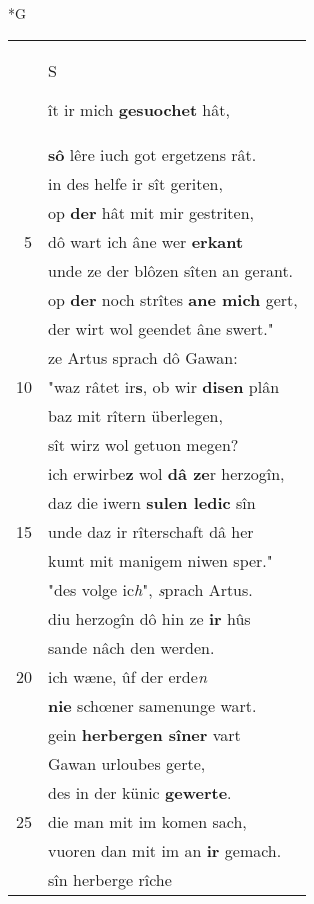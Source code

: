 \documentclass[8pt,a4paper,notitlepage]{article}
\begin{document}
\begin{table}[ht]
\begin{minipage}[t]{0.5\linewidth}
\small
\begin{center}*G
\end{center}
\begin{tabular}{rl}
 & \begin{large}S\end{large}ît ir mich \textbf{gesuochet} hât,\\ 
 & \textbf{sô} lêre iuch got ergetzens rât.\\ 
 & in des helfe ir sît geriten,\\ 
 & op \textbf{der} hât mit mir gestriten,\\ 
5 & dô wart ich âne wer \textbf{erkant}\\ 
 & unde ze der blôzen sîten an gerant.\\ 
 & op \textbf{der} noch strîtes \textbf{ane mich} gert,\\ 
 & der wirt wol geendet âne swert."\\ 
 & ze Artus sprach dô Gawan:\\ 
10 & "waz râtet ir\textbf{s}, ob wir \textbf{disen} plân\\ 
 & baz mit rîtern überlegen,\\ 
 & sît wirz wol getuon megen?\\ 
 & ich erwirbe\textbf{z} wol \textbf{dâ ze}r herzogîn,\\ 
 & daz die iwern \textbf{sulen ledic} sîn\\ 
15 & unde daz ir rîterschaft dâ her\\ 
 & kumt mit manigem niwen sper."\\ 
 & "des volge ic\textit{h}", \textit{s}prach Artus.\\ 
 & diu herzogîn dô hin ze \textbf{ir} hûs\\ 
 & sande nâch den werden.\\ 
20 & ich wæne, ûf der erde\textit{n}\\ 
 & \textbf{nie} schœner samenunge wart.\\ 
 & gein \textbf{herbergen sîner} vart\\ 
 & Gawan urloubes gerte,\\ 
 & des in der künic \textbf{gewerte}.\\ 
25 & die man mit im komen sach,\\ 
 & vuoren dan mit im an \textbf{ir} gemach.\\ 
 & sîn herberge rîche\\ 

\end{tabular}
\end{minipage}
\end{table}
\end{document}
